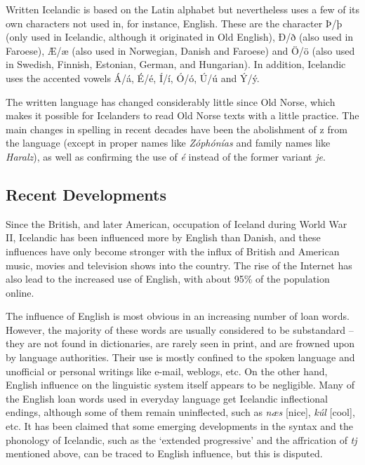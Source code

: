 \begin{multicols}{2}
Written Icelandic is based on the Latin alphabet but nevertheless uses a few of its own characters not used in, for instance, English. These are the character Þ/þ (only used in Icelandic, although it originated in Old English), Ð/ð (also used in Faroese), Æ/æ (also used in Norwegian, Danish and Faroese) and Ö/ö (also used in Swedish, Finnish, Estonian, German, and Hungarian). In addition, Icelandic uses the accented vowels Á/á, É/é, Í/í, Ó/ó, Ú/ú and Ý/ý.

The written language has changed considerably little since Old Norse, which makes it possible for Icelanders to read Old Norse texts with a little practice. The main changes in spelling in recent decades have been the abolishment of z from the language (except in proper names like \textit{Zóphónías} and family names like \textit{Haralz}), as well as confirming the use of \textit{é} instead of the former variant \textit{je}.

\subsection{Recent Developments}

Since the British, and later American, occupation of Iceland during World War II, Icelandic has been influenced more by English than Danish, and these influences have only become stronger with the influx of British and American music, movies and television shows into the country. The rise of the Internet has also lead to the increased use of English, with about 95\% of the population online.

The influence of English is most obvious in an increasing number of loan words. However, the majority of these words are usually considered to be substandard -- they are not found in dictionaries, are rarely seen in print, and are frowned upon by language authorities. Their use is mostly confined to the spoken language and unofficial or personal writings like e-mail, weblogs, etc.
On the other hand, English influence on the linguistic system itself appears to be negligible. Many of the English loan words used in everyday language get Icelandic inflectional endings, although some of them remain uninflected, such as \textit{næs} {[}nice{]}, \textit{kúl} {[}cool{]}, etc. It has been claimed that some emerging developments in the syntax and the phonology of Icelandic, such as the ‘extended progressive’ and the affrication of \textit{tj} mentioned above, can be traced to English influence, but this is disputed.


\end{multicols}
